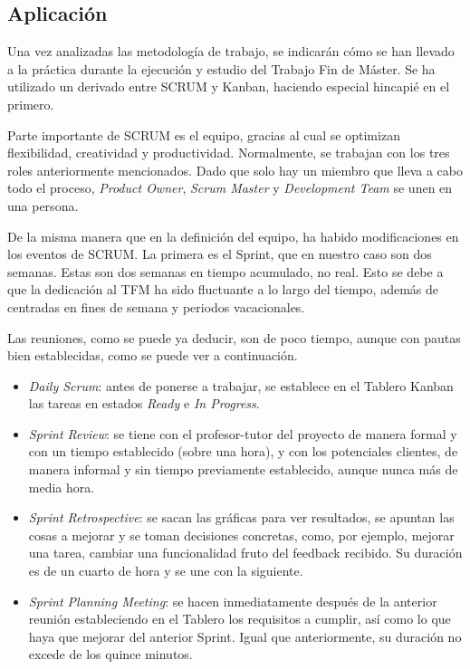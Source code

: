 \subsection{Aplicación}
Una vez analizadas las metodología de trabajo, se indicarán cómo se han llevado a la práctica durante la ejecución y estudio del Trabajo Fin de Máster. Se ha utilizado un derivado entre SCRUM y Kanban, haciendo especial hincapié en el primero.

Parte importante de SCRUM es el equipo, gracias al cual se optimizan flexibilidad, creatividad y productividad. Normalmente, se trabajan con los tres roles anteriormente mencionados. Dado que solo hay un miembro que lleva a cabo todo el proceso, \textit{Product Owner}, \textit{Scrum Master} y \textit{Development Team} se unen en una persona.

De la misma manera que en la definición del equipo, ha habido modificaciones en los eventos de SCRUM. La primera es el Sprint, que en nuestro caso son dos semanas. Estas son dos semanas en tiempo acumulado, no real. Esto se debe a que la dedicación al TFM ha sido fluctuante a lo largo del tiempo, además de centradas en fines de semana y periodos vacacionales.

Las reuniones, como se puede ya deducir, son de poco tiempo, aunque con pautas bien establecidas, como se puede ver a continuación.
\begin{itemize}
    \item \textit{Daily Scrum}: antes de ponerse a trabajar, se establece en el Tablero Kanban las tareas en estados \textit{Ready} e \textit{In Progress}.
    \item \textit{Sprint Review}: se tiene con el profesor-tutor del proyecto de manera formal y con un tiempo establecido (sobre una hora), y con los potenciales clientes, de manera informal y sin tiempo previamente establecido, aunque nunca más de media hora.
    \item \textit{Sprint Retrospective}: se sacan las gráficas para ver resultados, se apuntan las cosas a mejorar y se toman decisiones concretas, como, por ejemplo, mejorar una tarea, cambiar una funcionalidad fruto del feedback recibido. Su duración es de un cuarto de hora y se une con la siguiente.
    \item \textit{Sprint Planning Meeting}: se hacen inmediatamente después de la anterior reunión estableciendo en el Tablero los requisitos a cumplir, así como lo que haya que mejorar del anterior Sprint. Igual que anteriormente, su duración no excede de los quince minutos.
\end{itemize}

